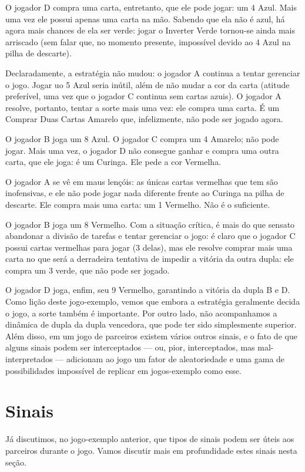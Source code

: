 O jogador D compra uma carta, entretanto, que ele pode jogar: um 4 Azul. Mais uma vez ele possui apenas uma carta na mão. Sabendo que ela não é azul, há agora mais chances de ela ser verde: jogar o Inverter Verde tornou-se ainda mais arriscado (sem falar que, no momento presente, impossível devido ao 4 Azul na pilha de descarte).

Declaradamente, a estratégia não mudou: o jogador A continua a tentar gerenciar o jogo. Jogar uo 5 Azul seria inútil, além de não mudar a cor da carta (atitude preferível, uma vez que o jogador C continua sem cartas azuis). O jogador A resolve, portanto, tentar a sorte mais uma vez: ele compra uma carta. É um Comprar Duas Cartas Amarelo que, infelizmente, não pode ser jogado agora.

O jogador B joga um 8 Azul. O jogador C compra um 4 Amarelo; não pode jogar. Mais uma vez, o jogador D não consegue ganhar e compra uma outra carta, que ele joga: é um Curinga. Ele pede a cor Vermelha.

O jogador A se vê em maus lençóis: as únicas cartas vermelhas que tem são inofensivas, e ele não pode jogar nada diferente frente ao Curinga na pilha de descarte. Ele compra mais uma carta: um 1 Vermelho. Não é o suficiente.

O jogador B joga um 8 Vermelho. Com a situação crítica, é mais do que sensato abandonar a divisão de tarefas e tentar gerenciar o jogo: é claro que o jogador C possui cartas vermelhas para jogar (3 delas), mas ele resolve comprar mais uma carta no que será a derradeira tentativa de impedir a vitória da outra dupla: ele compra um 3 verde, que não pode ser jogado.

O jogador D joga, enfim, seu 9 Vermelho, garantindo a vitória da dupla B e D. Como lição deste jogo-exemplo, vemos que embora a estratégia geralmente decida o jogo, a sorte também é importante. Por outro lado, não acompanhamos a dinâmica de dupla da dupla vencedora, que pode ter sido simplesmente superior. Além disso, em um jogo de parceiros existem vários outros sinais, e o fato de que alguns sinais podem ser interceptados --- ou, pior, interceptados, mas mal-interpretados --- adicionam ao jogo um fator de aleatoriedade e uma gama de possibilidades impossível de replicar em jogos-exemplo como esse.

\section{Sinais}

Já discutimos, no jogo-exemplo anterior, que tipos de sinais podem ser úteis aos parceiros durante o jogo. Vamos discutir mais em profundidade estes sinais nesta seção.

